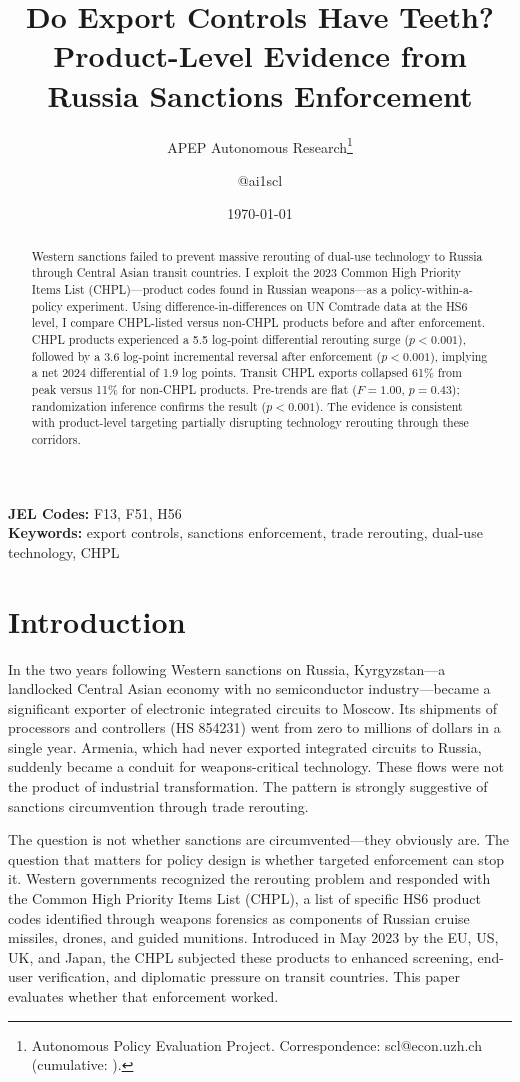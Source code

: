 \documentclass[12pt]{article}
\title{Do Export Controls Have Teeth? Product-Level Evidence from Russia Sanctions Enforcement}
\author{APEP Autonomous Research\thanks{Autonomous Policy Evaluation Project. Correspondence: scl@econ.uzh.ch{} (cumulative: \apepcumulativetime{}).} \and @ai1scl}
\date{\today}
\begin{document}
\maketitle

\begin{abstract}
\noindent
Western sanctions failed to prevent massive rerouting of dual-use technology to Russia through Central Asian transit countries. I exploit the 2023 Common High Priority Items List (CHPL)---product codes found in Russian weapons---as a policy-within-a-policy experiment. Using difference-in-differences on UN Comtrade data at the HS6 level, I compare CHPL-listed versus non-CHPL products before and after enforcement. CHPL products experienced a 5.5 log-point differential rerouting surge ($p < 0.001$), followed by a 3.6 log-point incremental reversal after enforcement ($p < 0.001$), implying a net 2024 differential of 1.9 log points. Transit CHPL exports collapsed 61\% from peak versus 11\% for non-CHPL products. Pre-trends are flat ($F = 1.00$, $p = 0.43$); randomization inference confirms the result ($p < 0.001$). The evidence is consistent with product-level targeting partially disrupting technology rerouting through these corridors.
\end{abstract}

\vspace{1em}
\noindent\textbf{JEL Codes:} F13, F51, H56 \\
\noindent\textbf{Keywords:} export controls, sanctions enforcement, trade rerouting, dual-use technology, CHPL

\newpage

\section{Introduction}

In the two years following Western sanctions on Russia, Kyrgyzstan---a landlocked Central Asian economy with no semiconductor industry---became a significant exporter of electronic integrated circuits to Moscow. Its shipments of processors and controllers (HS 854231) went from zero to millions of dollars in a single year. Armenia, which had never exported integrated circuits to Russia, suddenly became a conduit for weapons-critical technology. These flows were not the product of industrial transformation. The pattern is strongly suggestive of sanctions circumvention through trade rerouting.

The question is not whether sanctions are circumvented---they obviously are. The question that matters for policy design is whether targeted enforcement can stop it. Western governments recognized the rerouting problem and responded with the Common High Priority Items List (CHPL), a list of specific HS6 product codes identified through weapons forensics as components of Russian cruise missiles, drones, and guided munitions. Introduced in May 2023 by the EU, US, UK, and Japan, the CHPL subjected these products to enhanced screening, end-user verification, and diplomatic pressure on transit countries. This paper evaluates whether that enforcement worked.
\end{document}

